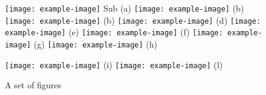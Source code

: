 \documentclass{article}
\begin{document}
    
	\thispagestyle{empty}   
	\begin{figure}[h]   
		\begin{tcbitemize}[raster columns=4,colback=cyan!20,colframe=cyan]
			\tcbitem \texttt{[image: example-image]} Sub (a)
			\tcbitem \texttt{[image: example-image]} (b)
			\tcbitem \texttt{[image: example-image]} (b)
			\tcbitem \texttt{[image: example-image]} (d)
			\tcbitem \texttt{[image: example-image]} (e)
			\tcbitem \texttt{[image: example-image]} (f)
			\tcbitem \texttt{[image: example-image]} (g)
			\tcbitem \texttt{[image: example-image]} (h)
		\end{tcbitemize}
		\begin{tcbitemize}[raster columns=2,colback=white,colframe=cyan]
			\tcbitem \texttt{[image: example-image]} (i)
			\tcbitem \texttt{[image: example-image]} (l)
		\end{tcbitemize}
		\caption{A set of figures}
	\end{figure}    
\end{document}
